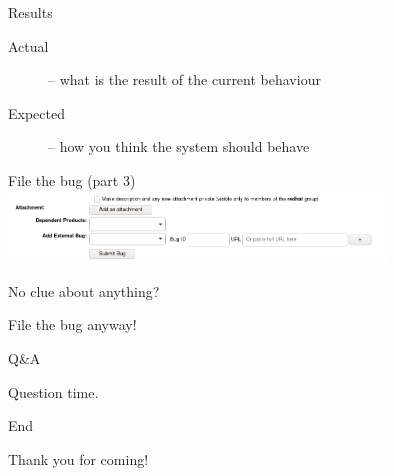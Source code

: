 \documentclass[12pt]{beamer}
\begin{document}
\begin{frame}{Results}
\begin{description}
	\item[Actual] -- what is the result of the current behaviour
	\item[Expected] -- how you think the system should behave
\end{description}
\end{frame}

\begin{frame}{File the bug (part 3)}
\includegraphics[width=10cm]{images/bz_footer.png}
\end{frame}

\begin{frame}{No clue about anything?}

{\Large File the bug anyway!}
\end{frame}

\begin{frame}{Q\&A}

{\Large Question time.}
\end{frame}

\begin{frame}{End}

{\Large Thank you for coming!}
\end{frame}
\end{document}
